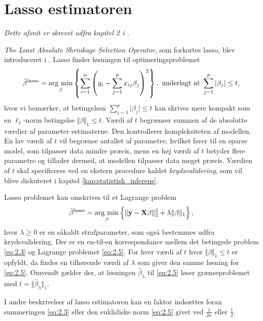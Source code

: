 \section{Lasso estimatoren} \label{sec:lasso_estimatoren}
\textit{Dette afsnit er skrevet udfra kapitel 2 i \citep{hastie}.}

\textit{The Least Absolute Shrinkage Selection Operator}, som forkortes lasso, blev introduceret i \citep{lasso}. 
Lasso finder løsningen til optimeringsproblemet
\begin{align}
\hat{\beta}^\text{lasso} = \argmin_{\beta} \cbr{\sum_{i=1}^n \del{y_i - \sum_{j=1}^p x_{ij} \beta_j}^2}, \ \text{underlagt at } \sum_{j=1}^p \vert \beta_j \vert \leq t, \label{eq:2.3}
\end{align} 
hvor vi bemærker, at betingelsen $\sum_{j=1}^p \vert \beta_j \vert \leq t$ kan skrives mere kompakt som en \(\ell_1\)-norm betingelse $\Vert \beta \Vert_1 \leq t$.
Værdi af \(t\) begrænser summen af de absolutte værdier af parameter estimaterne.
Den kontrollerer kompleksiteten af modellen. 
En lav værdi af \(t\) vil begrænse antallet af parametre, hvilket fører til en sparse model, som tilpasser data mindre præcis, mens en høj værdi af \(t\) betyder flere parametre og tillader dermed, at modellen tilpasser data meget præcis.
Værdien af \(t\) skal specificeres ved en ekstern procedure kaldet \textit{krydsvalidering}, som vil blive diskuteret i kapitel \ref{kap:statistisk_inferens}.

Lasso problemet kan omskrives til et Lagrange problem
\begin{align}
\hat{\beta}^\text{lasso} = \argmin_{\beta} \cbr{ \Vert \y - \X \beta \Vert_2^2 + \lambda \Vert \beta \Vert_1}, \label{eq:2.5}
\end{align}
hvor $\lambda \geq 0$ er en såkaldt strafparameter, som også bestemmes udfra krydsvalidering. 
Der er en en-til-en korrespondance mellem det betingede problem \eqref{eq:2.3} og Lagrange problemet \eqref{eq:2.5}. 
For hver værdi af \(t\) hvor \(\Vert \beta \Vert_1 \leq t\) er opfyldt, da findes en tilhørende værdi af $\lambda$ som giver den samme løsning for \eqref{eq:2.5}.
Omvendt gælder der, at løsningen $\hat{\beta}_\lambda$ til \eqref{eq:2.5} løser grænseproblemet med $t=\Vert \hat{\beta}_\lambda \Vert_1$.

I andre beskrivelser af lasso estimatoren kan en faktor indsættes foran summeringen \eqref{eq:2.3} eller den euklidiske norm \eqref{eq:2.5} givet ved \(\frac{1}{2n}\) eller \(\frac{1}{2}\).

